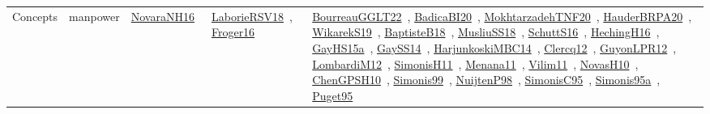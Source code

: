 {\begin{longtable}{lp{3cm}>{\raggedright\arraybackslash}p{6cm}>{\raggedright\arraybackslash}p{6cm}>{\raggedright\arraybackslash}p{8cm}}
Concepts & manpower & \href{../works/NovaraNH16.pdf}{NovaraNH16}~\cite{NovaraNH16} & \href{../works/LaborieRSV18.pdf}{LaborieRSV18}~\cite{LaborieRSV18}, \href{../works/Froger16.pdf}{Froger16}~\cite{Froger16} & \href{../works/BourreauGGLT22.pdf}{BourreauGGLT22}~\cite{BourreauGGLT22}, \href{../works/BadicaBI20.pdf}{BadicaBI20}~\cite{BadicaBI20}, \href{../works/MokhtarzadehTNF20.pdf}{MokhtarzadehTNF20}~\cite{MokhtarzadehTNF20}, \href{../works/HauderBRPA20.pdf}{HauderBRPA20}~\cite{HauderBRPA20}, \href{../works/WikarekS19.pdf}{WikarekS19}~\cite{WikarekS19}, \href{../works/BaptisteB18.pdf}{BaptisteB18}~\cite{BaptisteB18}, \href{../works/MusliuSS18.pdf}{MusliuSS18}~\cite{MusliuSS18}, \href{../works/SchuttS16.pdf}{SchuttS16}~\cite{SchuttS16}, \href{../works/HechingH16.pdf}{HechingH16}~\cite{HechingH16}, \href{../works/GayHS15a.pdf}{GayHS15a}~\cite{GayHS15a}, \href{../works/GaySS14.pdf}{GaySS14}~\cite{GaySS14}, \href{../works/HarjunkoskiMBC14.pdf}{HarjunkoskiMBC14}~\cite{HarjunkoskiMBC14}, \href{../works/Clercq12.pdf}{Clercq12}~\cite{Clercq12}, \href{../works/GuyonLPR12.pdf}{GuyonLPR12}~\cite{GuyonLPR12}, \href{../works/LombardiM12.pdf}{LombardiM12}~\cite{LombardiM12}, \href{../works/SimonisH11.pdf}{SimonisH11}~\cite{SimonisH11}, \href{../works/Menana11.pdf}{Menana11}~\cite{Menana11}, \href{../works/Vilim11.pdf}{Vilim11}~\cite{Vilim11}, \href{../works/NovasH10.pdf}{NovasH10}~\cite{NovasH10}, \href{../works/ChenGPSH10.pdf}{ChenGPSH10}~\cite{ChenGPSH10}, \href{../works/Simonis99.pdf}{Simonis99}~\cite{Simonis99}, \href{../works/NuijtenP98.pdf}{NuijtenP98}~\cite{NuijtenP98}, \href{../works/SimonisC95.pdf}{SimonisC95}~\cite{SimonisC95}, \href{../works/Simonis95a.pdf}{Simonis95a}~\cite{Simonis95a}, \href{../works/Puget95.pdf}{Puget95}~\cite{Puget95}\\

\end{longtable}}
